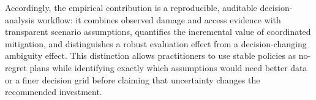 Accordingly, the empirical contribution is a reproducible, auditable
decision-analysis workflow: it combines observed damage and access evidence
with transparent scenario assumptions, quantifies the incremental value of
coordinated mitigation, and distinguishes a robust evaluation effect from a
decision-changing ambiguity effect. This distinction allows practitioners to
use stable policies as no-regret plans while identifying exactly which
assumptions would need better data or a finer decision grid before claiming
that uncertainty changes the recommended investment.
